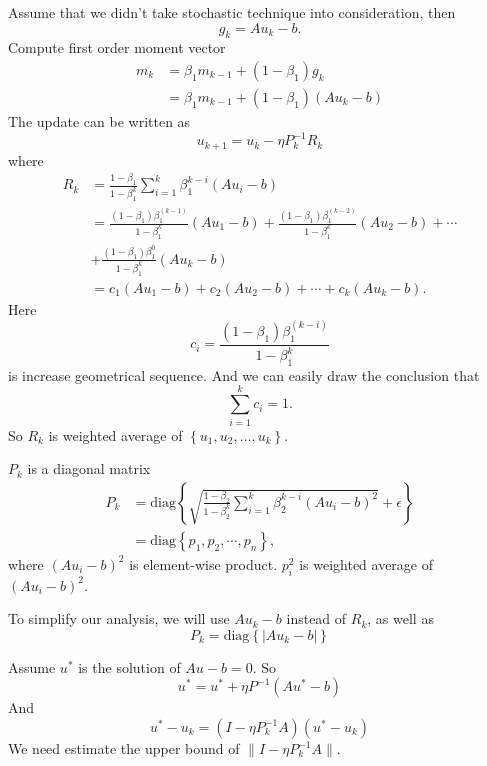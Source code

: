 Assume that we didn't take stochastic technique into consideration, then
\begin{equation}
g_k=A u_k-b.
\end{equation}
Compute first order moment vector
\begin{align}
m_k & = \beta_1 m_{k-1} +(1-\beta_1) g_k\\
&= \beta_1 m_{k-1} + (1-\beta_1) (A u_k - b)
\end{align}
The update can be written as
\begin{equation}
u_{k+1}=u_k-\eta P^{-1}_k R_k
\end{equation}
where
\begin{align}
R_k & =\frac{1-\beta_1}{1-\beta_1^k} \sum_{i=1}^{k} \beta_1^{k-i} (A u_i -b)\\
& = \frac{(1-\beta_1) \beta_1^{(k-1)}}{1-\beta_1^k} (Au_1 -b) + \frac{(1-\beta_1) \beta_1^{(k-2)}}{1-\beta_1^k} (Au_2 -b) +\cdots \\
& +\frac{(1-\beta_1) \beta_1^{0}}{1-\beta_1^k} (Au_k -b) \\
& =c_1 (Au_1-b) + c_2(Au_2-b) + \cdots + c_k (Au_k-b).
\end{align}
Here
\begin{equation}
c_i = \frac{(1-\beta_1) \beta_1^{(k-i)}}{1-\beta_1^k}
\end{equation}
is increase geometrical sequence. 
And we can easily draw the conclusion that
\begin{equation}
\sum_{i=1}^{k} c_i =1.
\end{equation}
So $R_k$ is weighted average of $\left\{u_1, u_2, \dots, u_k\right\}$.

$P_k$ is a diagonal matrix
\begin{align}
P_k & =\text{diag} \left\{
\sqrt{ \frac{1-\beta_2}{1-\beta_2^k} \sum_{i=1}^{k} \beta_2^{k-i} (A u_i -b)^2 }+\epsilon 
\right\}\\
& = \text{diag} \left\{ p_1, p_2, \cdots, p_n \right\},
\end{align}
where $(Au_i -b)^2$ is element-wise product.
$p_i^2$ is weighted average of $(A u_i-b)^2$.

To simplify our analysis, we will use $A u_k - b$ instead of $R_k$, as well as
\begin{equation}
	P_k=\text{diag} \left\{ |A u_k-b| \right\}
\end{equation}


Assume $u^*$ is the solution of $Au-b=0$.
So
\begin{equation}
u^* = u^* + \eta P^{-1} (A u^* -b)
\end{equation}
And
\begin{equation}
u^* -u_k = (I- \eta P_k^{-1} A) (u^* - u_k)
\end{equation}
We need estimate the upper bound of $\|I-\eta P^{-1}_k A\|$.

